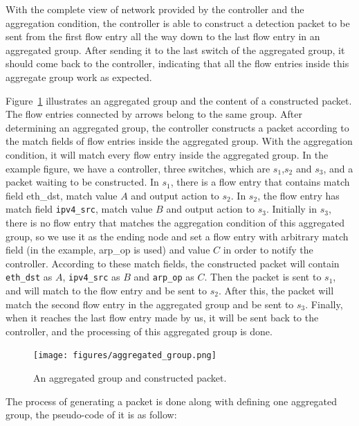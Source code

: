 With the complete view of network provided by the controller and the aggregation condition, the controller is able to construct a detection packet to be sent from the first flow entry all the way down to the last flow entry in an aggregated group. After sending it to the last switch of the aggregated group, it should come back to the controller, indicating that all the flow entries inside this aggregate group work as expected. 

Figure~\ref{aggregated_group} illustrates an aggregated group and the content of a constructed packet. The flow entries connected by arrows belong to the same group. After determining an aggregated group, the controller constructs a packet according to the match fields of flow entries inside the aggregated group. With the aggregation condition, it will match every flow entry inside the aggregated group. In the example figure, we have a controller, three switches, which are $s_1$,$s_2$ and $s_3$, and a packet waiting to be constructed. In $s_1$, there is a flow entry that contains match field eth\_dst, match value $A$ and output action to $s_2$. In $s_2$, the flow entry has match field \texttt{ipv4\_src}, match value $B$ and output action to $s_3$. Initially in $s_3$, there is no flow entry that matches the aggregation condition of this aggregated group, so we use it as the ending node and set a flow entry with arbitrary match field (in the example, arp\_op is used) and value $C$ in order to notify the controller. According to these match fields, the constructed packet will contain \texttt{eth\_dst} as $A$, \texttt{ipv4\_src} as $B$ and \texttt{arp\_op} as $C$. Then the packet is sent to $s_1$, and will match to the flow entry and be sent to $s_2$. After this, the packet will match the second flow entry in the aggregated group and be sent to $s_3$. Finally, when it reaches the last flow entry made by us, it will be sent back to the controller, and the processing of this aggregated group is done.

\begin{figure}[H]
\begin{center}
\texttt{[image: figures/aggregated\_group.png]}
\end{center}
\caption{An aggregated group and constructed packet.}
\label{aggregated_group}
\end{figure}

The process of generating a packet is done along with defining one aggregated group, the pseudo-code of it is as follow:

